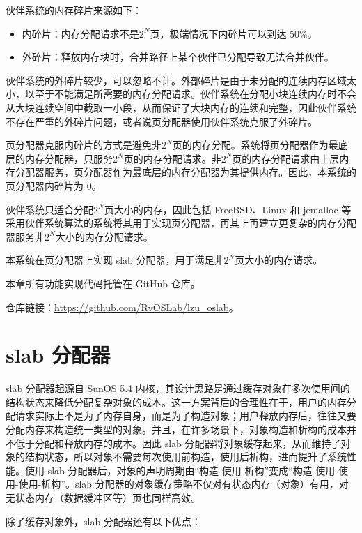 \documentclass[AutoFakeBold]{LZUThesis}
\begin{document}
\begin{sloppypar}
伙伴系统的内存碎片来源如下：

\begin{itemize}
\item
  内碎片：内存分配请求不是\(2^N\)页，极端情况下内碎片可以到达 50\%。
\item
  外碎片：释放内存块时，合并路径上某个伙伴已分配导致无法合并伙伴。
\end{itemize}

伙伴系统的外碎片较少，可以忽略不计。外部碎片是由于未分配的连续内存区域太小，以至于不能满足所需要的内存分配请求。伙伴系统在分配小块连续内存时不会从大块连续空间中截取一小段，从而保证了大块内存的连续和完整，因此伙伴系统不存在严重的外碎片问题，或者说页分配器使用伙伴系统克服了外碎片。

页分配器克服内碎片的方式是避免非\(2^N\)页的内存分配。系统将页分配器作为最底层的内存分配器，只服务\(2^N\)页的内存分配请求。非\(2^N\)页的内存分配请求由上层内存分配器服务，页分配器作为最底层的内存分配器为其提供内存。因此，本系统的页分配器内碎片为
0。

伙伴系统只适合分配\(2^N\)页大小的内存，因此包括 FreeBSD、Linux 和
jemalloc
等采用伙伴系统算法的系统将其用于实现页分配器，再其上再建立更复杂的内存分配器服务非\(2^N\)大小的内存分配请求。

本系统在页分配器上实现 slab 分配器，用于满足非\(2^N\)页大小的内存请求。

本章所有功能实现代码托管在 GitHub 仓库。

仓库链接：\href{https://github.com/RvOSLab/lzu_oslab}{https://github.com/RvOSLab/lzu\_oslab}。

\chapter{slab 分配器}

slab 分配器起源自 SunOS 5.4 内核，其设计思路是通过缓存对象在多次使用间的结构状态来降低分配复杂对象的成本。这一方案背后的合理性在于，用户的内存分配请求实际上不是为了内存自身，而是为了构造对象；用户释放内存后，往往又要分配内存来构造统一类型的对象。并且，在许多场景下，对象构造和析构的成本并不低于分配和释放内存的成本。因此
slab
分配器将对象缓存起来，从而维持了对象的结构状态，所以对象不需要每次使用前构造，使用后析构，进而提升了系统性能。使用
slab
分配器后，对象的声明周期由“构造-使用-析构”变成“构造-使用-使用-使用-析构”。slab
分配器的对象缓存策略不仅对有状态内存（对象）有用，对无状态内存（数据缓冲区等）页也同样高效。

除了缓存对象外，slab 分配器还有以下优点：


\end{sloppypar}
\end{document}
